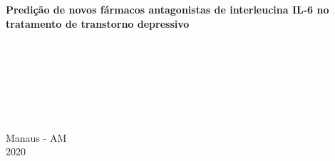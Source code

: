 \begin{titlepage}
\begin{center}
  \hspace{2cm}\large{}\\
  \hspace{2cm}\large{}\\
  
  \hspace{2cm}\large{}\\
  \hspace{2cm}\large{}\\

  \large\textbf{Predição de novos fármacos antagonistas de interleucina IL-6 no tratamento de transtorno depressivo}

  \hspace{2cm}\large{}\\
  \hspace{2cm}\large{}\\
  
  \par  
  \large{\thestudent}\\
  
  \hspace{2cm}\large{}\\
  \hspace{2cm}\large{}\\
 
  \par\vfill
  Manaus - AM \\ 2020

\end{center}
\end{titlepage}